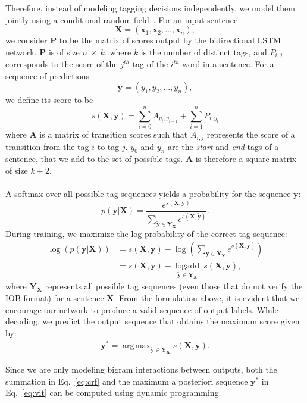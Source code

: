 \documentclass[11pt,letterpaper]{article}
\DeclareMathOperator{\logadd}{logadd}
\DeclareMathOperator*{\argmax}{\arg\!\max}
\begin{document}
Therefore, instead of modeling tagging decisions independently, we model them jointly using a conditional random field~\cite{lafferty2001conditional}. For an input sentence
$$\mathbf{X} = (\mathbf{x}_1, \mathbf{x}_2, \ldots, \mathbf{x}_n),$$
we consider $\mathbf{P}$ to be the matrix of scores output by the bidirectional LSTM network. $\mathbf{P}$ is of size $n~\times~k$, where $k$ is the number of distinct tags, and $P_{i, j}$ corresponds to the score of the $j^{th}$ tag of the $i^{th}$ word in a sentence. For a sequence of predictions
$$\mathbf{y} = (y_1, y_2, \ldots, y_n),$$
we define its score to be
$$s(\mathbf{X}, \mathbf{y})=\sum_{i=0}^{n} A_{y_i, y_{i+1}} + \sum_{i=1}^{n} P_{i, y_i}$$
where $\mathbf{A}$ is a matrix of transition scores such that $A_{i, j}$ represents the score of a transition from the tag $i$ to tag $j$. $y_0$ and $y_n$ are the \textit{start} and \textit{end} tags of a sentence, that we add to the set of possible tags. $\mathbf{A}$ is therefore a square matrix of size $k+2$.
\\
\\
A softmax over all possible tag sequences yields a probability for the sequence $\mathbf{y}$:
$$p(\mathbf{y} | \mathbf{X}) = \frac{
	e^{s(\mathbf{X}, \mathbf{y})}
}{
	\sum_{\mathbf{\widetilde{y}} \in \mathbf{Y_X}} e^{s(\mathbf{X}, \mathbf{\widetilde{y}})}
}.$$
During training, we maximize the log-probability of the correct tag sequence:
\\
\begin{align}
\log(p(\mathbf{y} | \mathbf{X})) &= s(\mathbf{X}, \mathbf{y}) - \log \left( \sum_{\mathbf{\widetilde{y}} \in \mathbf{Y_X}} e^{s(\mathbf{X}, \mathbf{\widetilde{y}})} \right) \nonumber \\
&= s(\mathbf{X}, \mathbf{y}) - \underset{{\mathbf{\widetilde{y}} \in \mathbf{Y_X}}}{\logadd}\ s(\mathbf{X}, \mathbf{\widetilde{y}}), \label{eq:crf}
\end{align}
where $\mathbf{Y_X}$ represents all possible tag sequences (even those that do not verify the IOB format) for a sentence $\mathbf{X}$. From the formulation above, it is evident that we encourage our network to produce a valid sequence of output labels. While decoding, we predict the output sequence that obtains the maximum score given by:
\begin{align}
\mathbf{y}^* = \argmax_{\mathbf{\widetilde{y}} \in \mathbf{Y_X}}{s(\mathbf{X}, \mathbf{\widetilde{y}})}. \label{eq:vit}
\end{align}

Since we are only modeling bigram interactions between outputs, both the summation in Eq.~\ref{eq:crf} and the maximum a posteriori sequence $\mathbf{y}^*$ in Eq.~\ref{eq:vit} can be computed using dynamic programming.
\end{document}
